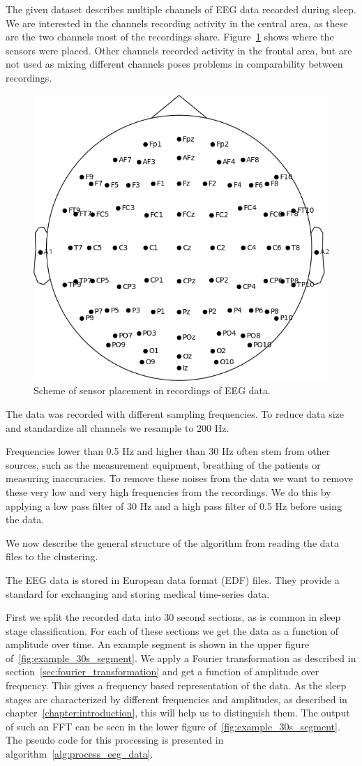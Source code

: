 The given dataset describes multiple channels of EEG data recorded during sleep. We are interested in the channels recording activity in the central area, as these are the two channels most of the recordings share. Figure~\ref{fig:head_placement} shows where the sensors were placed. Other channels recorded activity in the frontal area, but are not used as mixing different channels poses problems in comparability between recordings.

\begin{figure}[h]
	\centering
	\includegraphics[width=0.6\linewidth]{figs/head_placement}
	\caption{Scheme of sensor placement in recordings of EEG data.}
	\label{fig:head_placement}
\end{figure}

\newpage
The data was recorded with different sampling frequencies. To reduce data size and standardize all channels we resample to 200 Hz.

Frequencies lower than 0.5 Hz and higher than 30 Hz often stem from other sources, such as the measurement equipment, breathing of the patients or measuring inaccuracies. To remove these noises from the data we want to remove these very low and very high frequencies from the recordings. We do this by applying a low pass filter of 30 Hz and a high pass filter of 0.5 Hz before using the data.

We now describe the general structure of the algorithm from reading the data files to the clustering.

The EEG data is stored in European data format (EDF) files. They provide a standard for exchanging and storing medical time-series data.

First we split the recorded data into 30 second sections, as is common in sleep stage classification. For each of these sections we get the data as a function of amplitude over time. An example segment is shown in the upper figure of~\ref{fig:example_30s_segment}. We apply a Fourier transformation as described in section~\ref{sec:fourier_transformation} and get a function of amplitude over frequency. This gives a frequency based representation of the data. As the sleep stages are characterized by different frequencies and amplitudes, as described in chapter~\ref{chapter:introduction}, this will help us to distinguish them. The output of such an FFT can be seen in the lower figure of~\ref{fig:example_30s_segment}. The pseudo code for this processing is presented in algorithm~\ref{alg:process_eeg_data}.
\newpage

